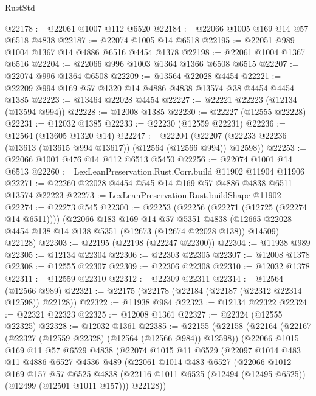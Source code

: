 \begin{lexlean}{RustStd}
\begin{coremodule}
@22178 := @22061 @1007 @112 @6520
@22184 := @22066 @1005 @169 @14 @57 @6518 @4838
@22187 := @22074 @1005 @14 @6518
@22195 := @22051 @989 @1004 @1367 @14 @4886 @6516 @4454 @1378
@22198 := @22061 @1004 @1367 @6516
@22204 := @22066 @996 @1003 @1364 @1366 @6508 @6515
@22207 := @22074 @996 @1364 @6508
@22209 := @13564 @22028 @4454
@22221 := @22209 @994 @169 @57 @1320 @14 @4886 @4838 @13574 @38 @4454 @4454 @1385
@22223 := @13464 @22028 @4454
@22227 := @22221 @22223 (@12134 (@13594 @994))
@22228 := @12008 @1385
@22230 := @22227 (@12555 @22228)
@22231 := @12032 @1385
@22233 := @22230 (@12559 @22231)
@22236 := @12564 (@13605 @1320 @14)
@22247 := @22204
    (@22207 (@22233 @22236 (@13613 (@13615 @994 @13617)) (@12564 (@12566 @994)) @12598))
@22253 := @22066 @1001 @476 @14 @112 @6513 @5450
@22256 := @22074 @1001 @14 @6513
@22260 := LexLeanPreservation.Rust.Corr.build @11902 @11904 @11906
@22271 := @22260 @22028 @4454 @545 @14 @169 @57 @4886 @4838 @6511 @13574 @22223
@22273 := LexLeanPreservation.Rust.buildShape @11902
@22274 := @22273 @545
@22300 := @22253
    (@22256 (@22271 (@12725 (@22274 @14 @6511))))
    (@22066
      @183
      @169
      @14
      @57
      @5351
      @4838
      (@12665 @22028 @4454 @138 @14 @138 @5351 (@12673 (@12674 @22028 @138)) @14509)
      @22128)
@22303 := @22195 (@22198 (@22247 @22300))
@22304 := @11938 @989
@22305 := @12134 @22304
@22306 := @22303 @22305
@22307 := @12008 @1378
@22308 := @12555 @22307
@22309 := @22306 @22308
@22310 := @12032 @1378
@22311 := @12559 @22310
@22312 := @22309 @22311
@22314 := @12564 (@12566 @989)
@22321 := @22175 (@22178 (@22184 (@22187 (@22312 @22314 @12598)) @22128))
@22322 := @11938 @984
@22323 := @12134 @22322
@22324 := @22321 @22323
@22325 := @12008 @1361
@22327 := @22324 (@12555 @22325)
@22328 := @12032 @1361
@22385 := @22155
    (@22158
      (@22164
        (@22167 (@22327 (@12559 @22328) (@12564 (@12566 @984)) @12598))
        (@22066
          @1015
          @169
          @11
          @57
          @6529
          @4838
          (@22074
            @1015
            @11
            @6529
            (@22097
              @1014
              @483
              @11
              @4886
              @6527
              @4536
              @489
              (@22061
                @1014
                @483
                @6527
                (@22066
                  @1012
                  @169
                  @157
                  @57
                  @6525
                  @4838
                  (@22116 @1011 @6525 (@12494 (@12495 @6525)) (@12499 (@12501 @1011 @157)))
                  @22128))

\end{coremodule}
\end{lexlean}
